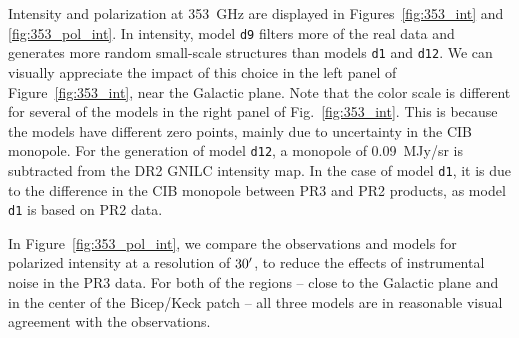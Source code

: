 \documentclass[twocolumn]{aastex631}
\begin{document}
Intensity and polarization at 353~GHz are displayed in Figures~\ref{fig:353_int} and \ref{fig:353_pol_int}. 
In intensity, model {\tt d9} filters more of the real data and generates more random small-scale structures than models {\tt d1} and {\tt d12}. We can visually appreciate the impact of this choice in the left panel of Figure~\ref{fig:353_int}, near the Galactic plane. 
Note that the color scale is different for several of the models in the right panel of Fig.~\ref{fig:353_int}. This is because the models have different zero points, mainly due to uncertainty in the CIB monopole. For the generation of model {\tt d12}, a monopole of 0.09~MJy/sr is subtracted from the DR2 GNILC intensity map. 
In the case of model {\tt d1}, it is due to the difference in the CIB monopole between PR3 and PR2 products, as model {\tt d1} is based on PR2 data. 

In Figure~\ref{fig:353_pol_int}, we compare the observations and models for polarized intensity at a resolution of $30\mbox{$^\prime$}$, to reduce the effects of instrumental noise in the PR3 data. 
For both of the regions -- close to the Galactic plane and in the center of the Bicep/Keck patch -- all three models are in reasonable visual agreement with the observations. 
\end{document}
